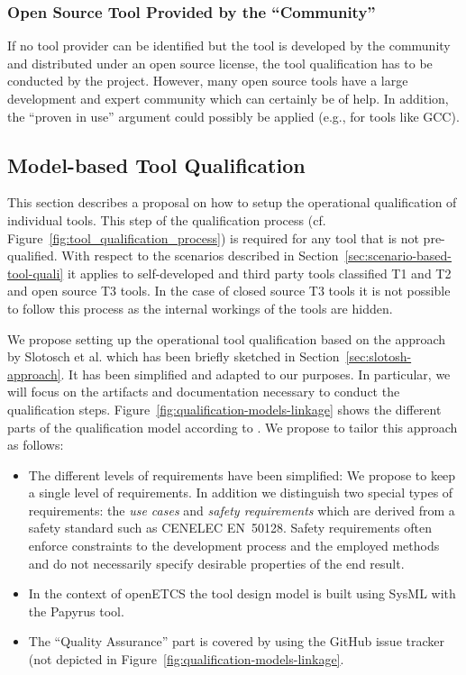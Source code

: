 \subsubsection{Open Source Tool Provided by the ``Community''}

If no tool provider can be identified but the tool is developed by the community and distributed under an open source license, the tool qualification has to be conducted by the project. However, many open source tools have a large development and expert community which can certainly be of help. In addition, the ``proven in use'' argument could possibly be applied (e.g., for tools like GCC).

\subsection{Model-based Tool Qualification}
\label{sec:model-based-tool-quali}

This section describes a proposal on how to setup the operational qualification of individual tools. This step of the qualification process (cf. Figure~\ref{fig:tool_qualification_process}) is required for any tool that is not pre-qualified. With respect to the scenarios described in Section~\ref{sec:scenario-based-tool-quali} it applies to self-developed and third party tools classified T1 and T2 and open source T3 tools. In the case of closed source T3 tools it is not possible to follow this process as the internal workings of the tools are hidden.

We propose setting up the operational tool qualification based on the approach by Slotosch et al. which has been briefly sketched in Section~\ref{sec:slotosh-approach}. It has been simplified and adapted to our purposes. In particular, we will focus on the artifacts and documentation necessary to conduct the qualification steps. Figure~\ref{fig:qualification-models-linkage} shows the different parts of the qualification model according to \cite{slotosch_model-based_2012}. We propose to tailor this approach as follows:
\begin{itemize}
    \item The different levels of requirements have been simplified: We propose to keep a single level of requirements. In addition we distinguish two special types of requirements: the \emph{use cases} and \emph{safety requirements} which are derived from a safety standard such as CENELEC EN~50128. Safety requirements often enforce constraints to the development process and the employed methods and do not necessarily specify desirable properties of the end result.
    \item In the context of openETCS the tool design model is built using SysML with the Papyrus tool. 
	\item The ``Quality Assurance'' part is covered by using the GitHub issue tracker (not depicted in Figure~\ref{fig:qualification-models-linkage}.
\end{itemize}

